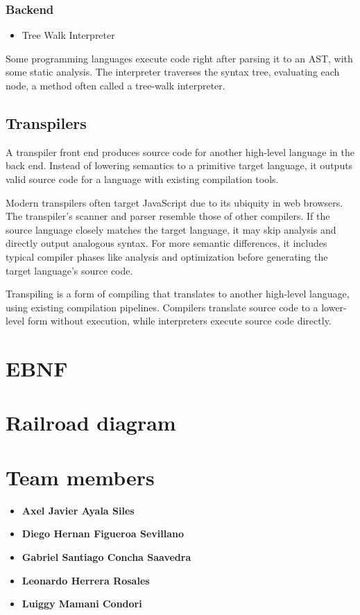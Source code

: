 \documentclass{article}
\begin{document}
\subsubsection{Backend}
\begin{itemize}
    \item Tree Walk Interpreter
\end{itemize}

Some programming languages execute code right after parsing it to an AST, with some static analysis. The interpreter traverses the syntax tree, evaluating each node, a method often called a tree-walk interpreter.

\subsection{Transpilers}
\label{sec:transpilers}

A transpiler front end produces source code for another high-level language in the back end. Instead of lowering semantics to a primitive target language, it outputs valid source code for a language with existing compilation tools.

Modern transpilers often target JavaScript due to its ubiquity in web browsers. The transpiler's scanner and parser resemble those of other compilers. If the source language closely matches the target language, it may skip analysis and directly output analogous syntax. For more semantic differences, it includes typical compiler phases like analysis and optimization before generating the target language's source code.

Transpiling is a form of compiling that translates to another high-level language, using existing compilation pipelines. Compilers translate source code to a lower-level form without execution, while interpreters execute source code directly.


\section{EBNF}
\label{sec:bnf}

\section{Railroad diagram}
\label{sec:grail-road}

\section{Team members}
\label{sec:members}
\begin{itemize}
    \item \textbf{Axel Javier Ayala Siles}
    \item \textbf{Diego Hernan Figueroa Sevillano}
    \item \textbf{Gabriel Santiago Concha Saavedra}
    \item \textbf{Leonardo Herrera Rosales}
    \item \textbf{Luiggy Mamani Condori}
\end{itemize}
\end{document}
